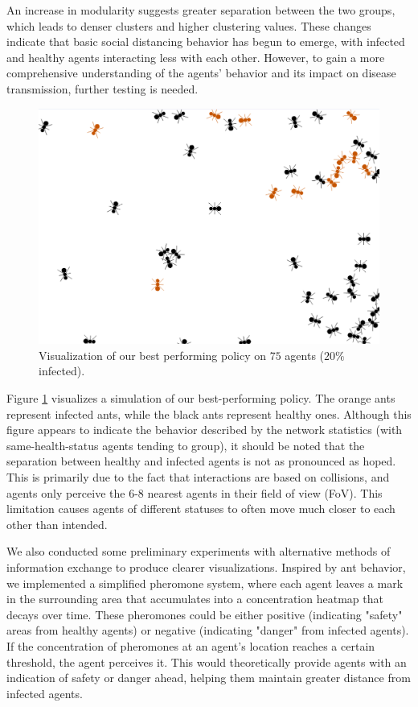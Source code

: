 \documentclass[9pt]{IEEEtran}
\begin{document}
An increase in modularity suggests greater separation between the two groups, which leads to denser clusters and higher clustering values. These changes indicate that basic social distancing behavior has begun to emerge, with infected and healthy agents interacting less with each other. However, to gain a more comprehensive understanding of the agents' behavior and its impact on disease transmission, further testing is needed.

\begin{figure}[hbt]
    \centering
    \includegraphics[width=0.9\linewidth]{trained_viz.png}
    \caption{Visualization of our best performing policy on $75$ agents ($20\%$ infected).}
    \label{fig:trained_viz}
\end{figure}

Figure \ref{fig:trained_viz} visualizes a simulation of our best-performing policy. The orange ants represent infected ants, while the black ants represent healthy ones. Although this figure appears to indicate the behavior described by the network statistics (with same-health-status agents tending to group), it should be noted that the separation between healthy and infected agents is not as pronounced as hoped. This is primarily due to the fact that interactions are based on collisions, and agents only perceive the 6-8 nearest agents in their field of view (FoV). This limitation causes agents of different statuses to often move much closer to each other than intended.

We also conducted some preliminary experiments with alternative methods of information exchange to produce clearer visualizations. Inspired by ant behavior, we implemented a simplified pheromone system, where each agent leaves a mark in the surrounding area that accumulates into a concentration heatmap that decays over time. These pheromones could be either positive (indicating "safety" areas from healthy agents) or negative (indicating "danger" from infected agents). If the concentration of pheromones at an agent's location reaches a certain threshold, the agent perceives it. This would theoretically provide agents with an indication of safety or danger ahead, helping them maintain greater distance from infected agents.
\end{document}
